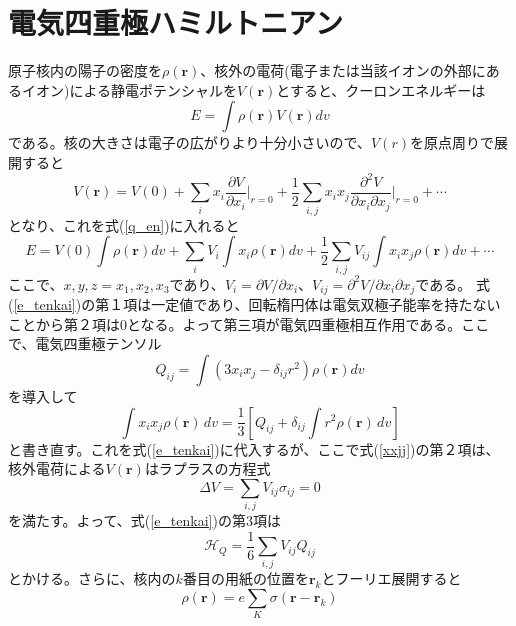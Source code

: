 \documentclass[11pt,a4j]{jreport}
\begin{document}
\section{電気四重極ハミルトニアン}
原子核内の陽子の密度を$\rho(\mathbf{r})$、核外の電荷(電子または当該イオンの外部にあるイオン)による静電ポテンシャルを$V(\mathbf{r})$とすると、クーロンエネルギーは
\begin{equation}
  E = \int \rho(\mathbf{r}) V(\mathbf{r}) dv
  \label{q_en}
\end{equation}
である。核の大きさは電子の広がりより十分小さいので、$V(r)$を原点周りで展開すると
\begin{equation}
V(\mathbf{r}) = V(0) + \sum_i x_i \frac{\partial V}{\partial x_i}\Big|_{r=0} + \frac{1}{2} \sum_{i,j} x_i x_j \frac{\partial^2 V}{\partial x_i \partial x_j}\Big|_{r=0} + \cdots
\end{equation}
となり、これを式(\ref{q_en})に入れると
\begin{equation}
  E = V(0) \int \rho(\mathbf{r}) dv + \sum_i V_i \int x_i \rho(\mathbf{r}) dv + \frac{1}{2} \sum_{i,j} V_{ij} \int x_i x_j \rho(\mathbf{r}) dv + \cdots
  \label{e_tenkai}
\end{equation}
ここで、$x, y, z = x_1, x_2, x_3$であり、$V_i = \partial V/\partial x_i$、$V_{ij} = \partial^2 V/\partial x_i \partial x_j$である。
式(\ref{e_tenkai})の第１項は一定値であり、回転楕円体は電気双極子能率を持たないことから第２項は0となる。よって第三項が電気四重極相互作用である。ここで、電気四重極テンソル
\begin{equation}
  Q_{ij} = \int (3 x_i x_j - \delta_{ij} r^2) \rho(\mathbf{r}) dv
\end{equation}
を導入して
\begin{equation}
  \int x_i x_j \rho(\mathbf{r}) \, dv = \frac{1}{3} \left[ Q_{ij} + \delta_{ij} \int r^2 \rho(\mathbf{r}) \, dv \right]
  \label{xxij}
\end{equation}
と書き直す。これを式(\ref{e_tenkai})に代入するが、ここで式(\ref{xxjj})の第２項は、核外電荷による$V(\bm r)$はラプラスの方程式
\begin{equation}
  \Delta V = \sum_{i,j}V_{ij}\sigma_{ij}=0
\end{equation}
を満たす。よって、式(\ref{e_tenkai})の第3項は
\begin{equation}
  \mathcal{H}_Q = \frac{1}{6}\sum_{i,j}V_{ij}Q_{ij}
\end{equation}
とかける。さらに、核内の$k$番目の用紙の位置を$\bm {r}_k$とフーリエ展開すると
\begin{equation}
  \rho(\bm r)=e\sum_K\sigma(\bm r- \bm {r}_k)
\end{equation}
\end{document}
